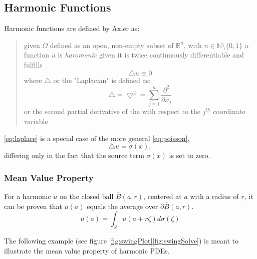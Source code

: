 \subsection{Harmonic Functions}\label{sssec:harmonics}
Harmonic functions are defined by Axler as:
\begin{quote} given $\Omega$ defined as an open, non-empty subset of
  $\mathbb{R}^{n}$, with $n \in \mathbb{N}\setminus \{0,1\}$
  a function $u$ is \textit{haromonic} given it is twice continuously differentiable
  and fulfills \begin{equation}\tag{Laplace's Equation} \bigtriangleup u \equiv 0 \label{eq:laplace}\end{equation}
  where $\bigtriangleup$ or the "Laplacian" is defined as:
  \begin{equation}
    \bigtriangleup = \bigtriangledown^{2} = \sum_{j=1}^{n} \frac{\partial^{2}}{\partial{x_{j}}}
  \end{equation} or the second partial derivative of the with respect to the $j^{th}$ coordinate variable
  \cite{Axler1992}
  \end{quote}
\ref{eq:laplace} is a special case of the more general \ref{eq:poisson},
\begin{equation}
\tag{Poisson's Equation} \bigtriangleup u = \sigma(x), \label{eq:poisson}
\end{equation}
differing only in the fact that the source term $\sigma(x)$ is set to zero\cite{Hunt}.

  \subsubsection{Mean Value Property}\label{sssec:meanvalue}
  For a harmonic $u$ on the closed ball $\bar{B}(a,r)$, centered at $a$ with a radius of $r$,
  it can be proven that $u(a)$ equals the average over $\partial \bar{B}(a,r)$\cite{Axler1992,Bornemann}.
\begin{equation}
  \tag{Mean Value Property}
  u(a) = \int_{S} u(a + r\zeta)d\sigma(\zeta)
  \label{eq:mean}
\end{equation}

The following example (see figure \ref{fig:swingPlot}\ref{fig:swingSolve}) is meant to illustrate
the mean value property of harmonic \Glspl{PDE}.

